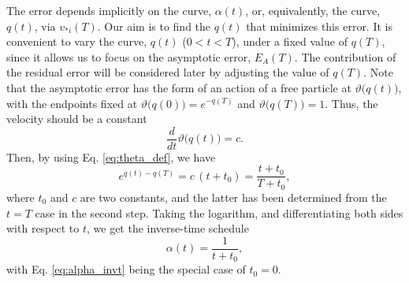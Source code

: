 \documentclass[reprint, superscriptaddress, floatfix]{revtex4-1}
\newcommand{\Err}{E}
\begin{document}
The error depends implicitly on the curve, $\alpha(t)$,
or, equivalently, the curve, $q(t)$,
via $v_{*i}(T)$.
%
%
Our aim is to find the $q(t)$
that minimizes this error.
%
It is convenient to
vary the curve, $q(t)$ ($0 < t < T$),
under a fixed value of $q(T)$,
since it allows us to focus on
the asymptotic error, $E_A(T)$.
%
The contribution of the residual error
will be considered later
by adjusting the value of $q(T)$.
%
Note that the asymptotic error
has the form of an action of a free particle
at $\vartheta\bigl( q(t) \bigr)$,
with the endpoints fixed at
$\vartheta\bigl( q(0) \bigr)  = e^{- q(T)}$
and
$\vartheta\bigl( q(T) \bigr) = 1$.
%
Thus, the velocity should be a constant
%
\begin{equation}
  \frac{d}{dt} \vartheta\bigl( q(t) \bigr) = c
  .
\label{eq:dthetadt_const}
\end{equation}
%
Then, by using Eq. \eqref{eq:theta_def}, we have
%
\begin{equation}
  e^{ q(t) - q(T) }
  =
  c \, (t + t_0)
  =
  \frac{ t + t_0 }
       { T + t_0 }
  ,
\label{eq:expqt}
\end{equation}
%
where $t_0$ and $c$ are two constants,
and the latter has been determined
from the $t = T$ case
in the second step.
%
Taking the logarithm,
and differentiating both sides
with respect to $t$,
we get the inverse-time schedule
%
\begin{equation}
  \alpha(t) = \frac{ 1 }{ t + t_0 }
  ,
\label{eq:alpha_invt1}
\end{equation}
%
with Eq. \eqref{eq:alpha_invt} being
the special case of $t_0 = 0$.
%
\end{document}
